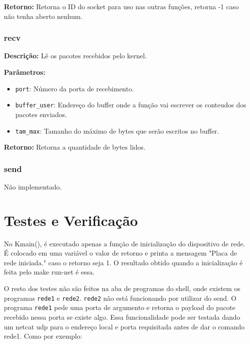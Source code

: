 \textbf{Retorno:}
Retorna o ID do socket para uso nas outras funções, retorna -1 caso não tenha aberto nenhum.

\subsubsection{recv}

\textbf{Descrição:}
Lê os pacotes recebidos pelo kernel.

\textbf{Parâmetros:}
\begin{itemize}
\item \texttt{port}: Número da porta de recebimento.
\item \texttt{buffer\_user}: Endereço do buffer onde a função vai escrever os conteudos dos pacotes enviados.
\item \texttt{tam\_max}: Tamanho do máximo de bytes que serão escritos no buffer.
\end{itemize}

\textbf{Retorno:}
Retorna a quantidade de bytes lidos.


\subsubsection{send}
Não implementado.



\section{Testes e Verificação}
%
%
No Kmain(), é executado apenas a função de inicialização do dispositivo de rede. É colocado em uma variável o valor de retorno e printa a mensagem "Placa de rede iniciada." caso o retorno seja 1. O resultado obtido quando a inicialização é feita pelo make run-net é essa.

O resto dos testes não são feitos na aba de programas do shell, onde existem os programas \texttt{rede1} e \texttt{rede2}. \texttt{rede2} não está funcionando por utilizar do send.
O programa \texttt{rede1} pede uma porta de argumento e retorna o payload do pacote recebido nessa porta se existe algo. Essa funcionalidade pode ser testada dando um netcat udp para o endereço local e porta requisitada antes de dar o comando rede1. Como por exemplo:


